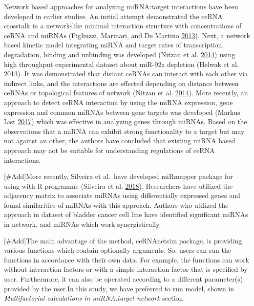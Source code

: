 \documentclass[]{article}
\begin{document}
Network based approaches for analyzing miRNA:target interactions have
been developed in earlier studies. An initial attempt demonstrated the
ceRNA crosstalk in a network-like minimal interaction structure with
concentrations of ceRNA and miRNAs (Figliuzzi, Marinari, and De Martino
\protect\hyperlink{ref-figliuzzi_micrornas_2013}{2013}). Next, a network
based kinetic model integrating miRNA and target rates of transcription,
degradation, binding and unbinding was developed (Nitzan et al.
\protect\hyperlink{ref-nitzan_interactions_2014}{2014}) using high
throughput experimental dataset about miR-92a depletion (Helwak et al.
\protect\hyperlink{ref-helwak_mapping_2013}{2013}). It was demonstrated
that distant ceRNAs can interact with each other via indirect links, and
the interactions are effected depending on distance between ceRNAs or
topological features of network (Nitzan et al.
\protect\hyperlink{ref-nitzan_interactions_2014}{2014}). More recently,
an approach to detect ceRNA interaction by using the miRNA expression,
gene expression and common miRNAs between gene targets was developed
(Markus List \protect\hyperlink{ref-markus_list_sponge_2017}{2017})
which was effective in analyzing genes through miRNAs. Based on the
observations that a miRNA can exhibit strong functionality to a target
but may not against an other, the authors have concluded that existing
miRNA based approach may not be suitable for understanding regulations
of ceRNA interactions.

{[}\#Add{]}More recently, Silveira et al.~have developed miRmapper
package for using with R programme (Silveira et al.
\protect\hyperlink{ref-da2018mirmapper}{2018}). Researchers have
utilized the adjacency matrix to associate miRNAs using differentially
expressed genes and found similarities of miRNAs with this approach.
Authors who utilized the approach in dataset of bladder cancer cell line
have identified significant miRNAs in network, and miRNAs which work
synergistically.

{[}\#Add{]}The main advantage of the method, ceRNAnetsim package, is
providing various functions which contain optionally arguments. So,
users can run the functions in accordance with their own data. For
example, the functions can work without interaction factors or with a
simple interaction factor that is specified by user. Furthermore, it can
also be operated according to a different parameter(s) provided by the
user.In this study, we have preferred to run model, shown in
\emph{Multifactorial calculations in miRNA:target network} section.
\end{document}
